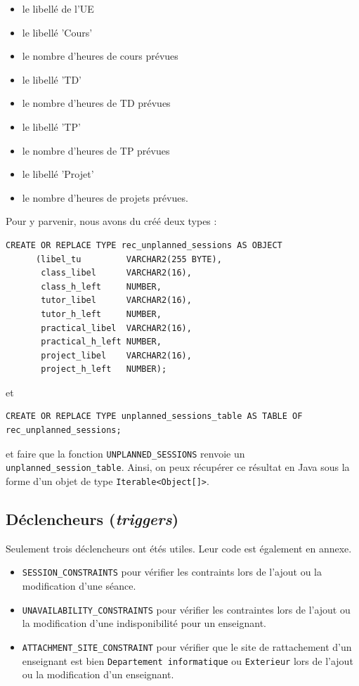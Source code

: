 \documentclass{article}
\begin{document}
\begin{itemize}
\begin{itemize}
\item le libellé de l'UE
\item le libellé 'Cours'
\item le nombre d'heures de cours prévues
\item le libellé 'TD'
\item le nombre d'heures de TD prévues
\item le libellé 'TP'
\item le nombre d'heures de TP prévues
\item le libellé 'Projet'
\item le nombre d'heures de projets prévues.
\end{itemize}
Pour y parvenir, nous avons du créé deux types :
\begin{verbatim}
CREATE OR REPLACE TYPE rec_unplanned_sessions AS OBJECT
      (libel_tu         VARCHAR2(255 BYTE),
       class_libel      VARCHAR2(16),
       class_h_left     NUMBER,
       tutor_libel      VARCHAR2(16),
       tutor_h_left     NUMBER,
       practical_libel  VARCHAR2(16),
       practical_h_left NUMBER,
       project_libel    VARCHAR2(16),
       project_h_left   NUMBER);

\end{verbatim}
et
\begin{verbatim}
CREATE OR REPLACE TYPE unplanned_sessions_table AS TABLE OF rec_unplanned_sessions;
\end{verbatim}
et faire que la fonction \texttt{UNPLANNED\_SESSIONS} renvoie un \texttt{unplanned\_session\_table}. Ainsi, on peux récupérer ce résultat en Java sous la forme d'un objet de type \texttt{Iterable<Object[]>}.
\end{itemize}

\subsection{Déclencheurs (\textit{triggers})}
Seulement trois déclencheurs ont étés utiles. Leur code est également en annexe.
\begin{itemize}
\item \texttt{SESSION\_CONSTRAINTS} pour vérifier les contraints lors de l'ajout ou la modification d'une séance.
\item \texttt{UNAVAILABILITY\_CONSTRAINTS} pour vérifier les contraintes lors de l'ajout ou la modification d'une indisponibilité pour un enseignant.
\item \texttt{ATTACHMENT\_SITE\_CONSTRAINT} pour vérifier que le site de rattachement d'un enseignant est bien \texttt{Departement informatique} ou \texttt{Exterieur} lors de l'ajout ou la modification d'un enseignant.
\end{itemize}
\end{document}
